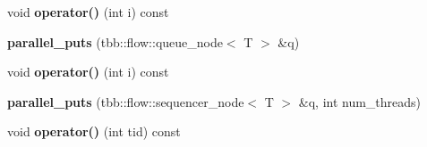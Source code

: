 \begin{DoxyCompactItemize}
\item 
\hypertarget{structparallel__puts_a90a7bdea12055b7d5444d8516edddfa7}{}void {\bfseries operator()} (int i) const \label{structparallel__puts_a90a7bdea12055b7d5444d8516edddfa7}

\item 
\hypertarget{structparallel__puts_ab9475bb101ab4758480f3b15eded0398}{}{\bfseries parallel\+\_\+puts} (tbb\+::flow\+::queue\+\_\+node$<$ T $>$ \&q)\label{structparallel__puts_ab9475bb101ab4758480f3b15eded0398}

\item 
\hypertarget{structparallel__puts_a90a7bdea12055b7d5444d8516edddfa7}{}void {\bfseries operator()} (int i) const \label{structparallel__puts_a90a7bdea12055b7d5444d8516edddfa7}

\item 
\hypertarget{structparallel__puts_acf0a7b1b4f6a75f2dc892db9f83bb261}{}{\bfseries parallel\+\_\+puts} (tbb\+::flow\+::sequencer\+\_\+node$<$ T $>$ \&q, int num\+\_\+threads)\label{structparallel__puts_acf0a7b1b4f6a75f2dc892db9f83bb261}

\item 
\hypertarget{structparallel__puts_ae6d0a3bfd018ad1ba105172801795578}{}void {\bfseries operator()} (int tid) const \label{structparallel__puts_ae6d0a3bfd018ad1ba105172801795578}

\end{DoxyCompactItemize}
